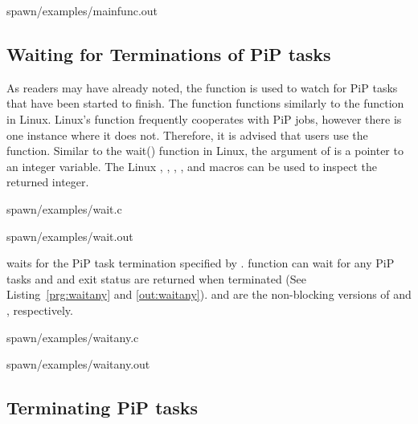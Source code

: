  {spawn/examples/mainfunc.out}


\subsection{Waiting for Terminations of PiP tasks}

As readers may have already noted, the  function
is used to watch for PiP tasks that have been started to finish. The
 function functions similarly to the
 function in Linux. Linux's 
 function frequently cooperates with PiP jobs,
however there is one instance where it does not. Therefore, it is
advised that users use the  function.  Similar to
the wait() function in Linux, the argument of  is
a pointer to an integer variable. The Linux ,
, ,
, and  macros can be
used to inspect the returned integer.


                {spawn/examples/wait.c}

 {spawn/examples/wait.out}

 waits for the PiP task termination specified by
        {\PIPID}. 
 function can wait for any PiP tasks and
        {\PIPID} and exit status are returned when terminated (See
        Listing~\ref{prg:waitany} and \ref{out:waitany}).
         and  are
        the non-blocking versions of  and
        , respectively. 


                {spawn/examples/waitany.c}

 {spawn/examples/waitany.out}


\subsection{Terminating PiP tasks}

